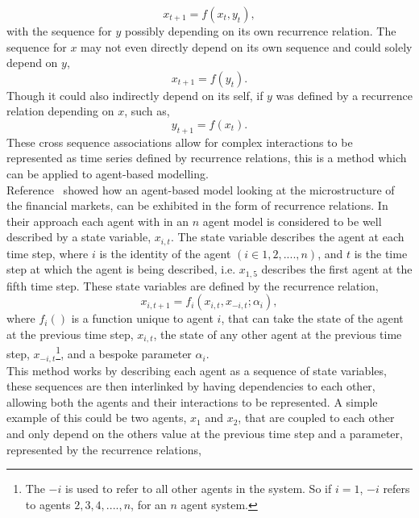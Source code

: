 \documentclass{article}
\begin{document}
\begin{equation}
x_{t+1} = f(x_{t}, y_{t}),
\end{equation}
with the sequence for $y$ possibly depending on its own recurrence relation. The sequence for $x$ may not even directly depend on its own sequence and could solely depend on $y$, 
\begin{equation}
x_{t+1} = f(y_{t}).
\end{equation}
Though it could also indirectly depend on its self, if $y$ was defined by a recurrence relation depending on $x$, such as, 
\begin{equation}
y_{t+1} = f(x_{t}).
\end{equation}
These cross sequence associations allow for complex interactions to be represented as time series defined by recurrence relations, this is a method which can be applied to agent-based modelling.\\
Reference~\cite{econmistsnoabm} showed how an agent-based model looking at the microstructure of the financial markets, can be exhibited in the form of recurrence relations. In their approach each agent with in an $n$ agent model is considered to be well described by a state variable, $x_{i, t}$. The state variable describes the agent at each time step, where $i$ is the identity of the agent $(i \in 1,2,....,n)$, and $t$ is the time step at which the agent is being described, i.e. $x_{1,5}$ describes the first agent at the fifth time step. These state variables are defined by the recurrence relation,     
\begin{equation} \label{eq:notimedelayrecur}
x_{i, t+1} = f_{i}(x_{i, t}, x_{-i,t}; \alpha_{i}),
\end{equation}
where $f_{i}()$ is a function unique to agent $i$, that can take the state of the agent at the previous time step, $x_{i, t}$, the state of any other agent at the previous time step, $x_{-i, t}$\footnote{The $-i$ is used to refer to all other agents in the system. So if $i=1$, $-i$ refers to agents $2,3,4,....,n$, for an $n$ agent system.}, and a bespoke parameter $\alpha_{i}$.\\
This method works by describing each agent as a sequence of state variables, these sequences are then interlinked by having dependencies to each other, allowing both the agents and their interactions to be represented. A simple example of this could be two agents, $x_{1}$ and $x_{2}$, that are coupled to each other and only depend on the others value at the previous time step and a parameter, represented by the recurrence relations,     
\end{document}
